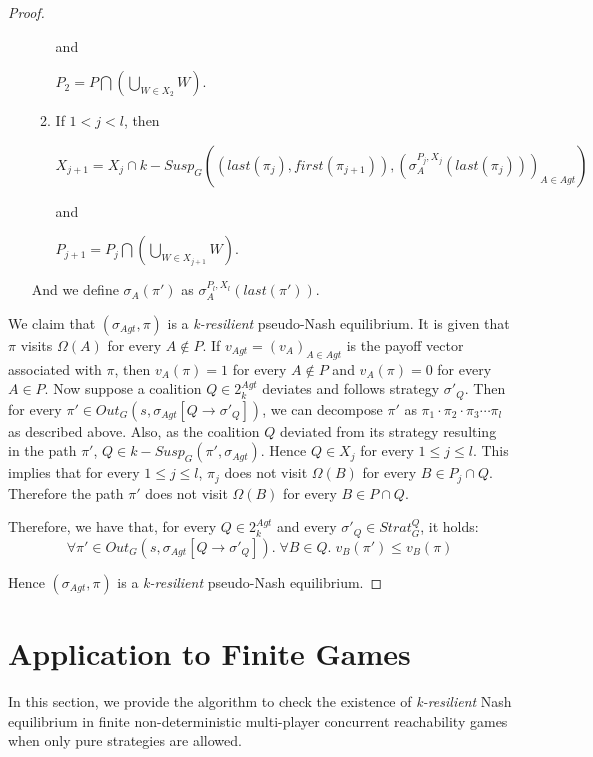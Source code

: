 \begin{proof}
\begin{enumerate}
\begin{enumerate}
and

$P_{2} = P \bigcap \left( \bigcup \limits_{W \in X_{2}}W \right)$.
\item If $1 < j < l$, then 

$X_{j+1} = X_{j} \cap k-Susp_{G}((last(\pi_{j}), first(\pi_{j+1})), (\sigma_{A}^{P_{j}, X_{j}}(last(\pi_{j})))_{A\in Agt})$

and

$P_{j+1} = P_{j} \bigcap \left( \bigcup \limits_{W \in X_{j+1}}W \right)$.
\end{enumerate}
And we define $\sigma_{A}(\pi')$ as $\sigma_{A}^{P_{l}, X_{l}}(last(\pi'))$.
\end{enumerate}

We claim that $(\sigma_{Agt}, \pi)$ is a \textit{k-resilient} pseudo-Nash equilibrium. It is given that $\pi$ visits $\Omega(A)$ for every $A \notin P$. If $v_{Agt} = (v_{A})_{A\in Agt}$ is the payoff vector associated with $\pi$, then $v_{A}(\pi) = 1$ for every $A \notin P$ and $v_{A}(\pi) = 0$ for every $A \in P$. Now suppose a coalition $Q \in 2^{Agt}_{k}$ deviates and follows strategy $\sigma'_{Q}$. Then for every $\pi' \in Out_{G}(s, \sigma_{Agt}[Q \rightarrow \sigma'_{Q}])$, we can decompose $\pi'$ as $\pi_{1} \cdot \pi_{2} \cdot \pi_{3} \cdots \pi_{l}$ as described above. Also, as the coalition $Q$ deviated from its strategy resulting in the path $\pi'$, $Q \in k-Susp_{G}(\pi', \sigma_{Agt})$. Hence $Q \in X_{j}$ for every $1 \leq j \leq l$. This implies that for every $1 \leq j \leq l$, $\pi_{j}$ does not visit $\Omega(B)$ for every $B \in P_{j} \cap Q$. Therefore the path $\pi'$ does not visit $\Omega(B)$ for every $B \in P \cap Q$.

Therefore, we have that, for every $Q \in 2^{Agt}_{k}$ and every $\sigma'_{Q} \in Strat^{Q}_{G}$, it holds:
\[\forall \pi' \in Out_{G}(s, \sigma_{Agt}[Q \rightarrow \sigma'_{Q}]). \; \forall B \in Q. \; v_{B}(\pi') \leq v_{B}(\pi)\]

Hence $(\sigma_{Agt}, \pi)$ is a \textit{k-resilient} pseudo-Nash equilibrium.
\end{proof}

\section{Application to Finite Games}

In this section, we provide the algorithm to check the existence of \textit{k-resilient} Nash equilibrium in finite non-deterministic multi-player concurrent reachability games when only pure strategies are allowed.

